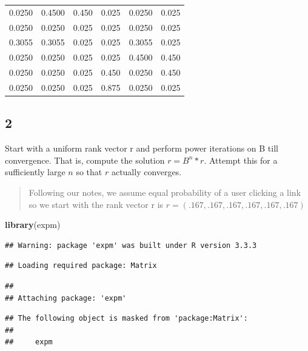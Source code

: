 \documentclass[]{article}
\newenvironment{Shaded}{\begin{snugshade}}{\end{snugshade}}
\newcommand{\KeywordTok}[1]{\textcolor[rgb]{0.13,0.29,0.53}{\textbf{{#1}}}}
\newcommand{\DecValTok}[1]{\textcolor[rgb]{0.00,0.00,0.81}{{#1}}}
\newcommand{\StringTok}[1]{\textcolor[rgb]{0.31,0.60,0.02}{{#1}}}
\newcommand{\NormalTok}[1]{{#1}}
\begin{document}
\begin{longtable}[]{@{}rrrrrr@{}}
\toprule
0.0250 & 0.4500 & 0.450 & 0.025 & 0.0250 & 0.025\tabularnewline
0.0250 & 0.0250 & 0.025 & 0.025 & 0.0250 & 0.025\tabularnewline
0.3055 & 0.3055 & 0.025 & 0.025 & 0.3055 & 0.025\tabularnewline
0.0250 & 0.0250 & 0.025 & 0.025 & 0.4500 & 0.450\tabularnewline
0.0250 & 0.0250 & 0.025 & 0.450 & 0.0250 & 0.450\tabularnewline
0.0250 & 0.0250 & 0.025 & 0.875 & 0.0250 & 0.025\tabularnewline
\bottomrule
\end{longtable}

\subsection{2}\label{section-1}

Start with a uniform rank vector r and perform power iterations on B
till convergence. That is, compute the solution \(r = B^n * r\). Attempt
this for a sufficiently large \(n\) so that \(r\) actually converges.

\begin{quote}
Following our notes, we assume equal probability of a user clicking a
link so we start with the rank vector r is
\(r = (.167, .167, .167, .167, .167, .167)\)
\end{quote}

\begin{Shaded}
\begin{Highlighting}[]
\KeywordTok{library}\NormalTok{(expm) }
\end{Highlighting}
\end{Shaded}

\begin{verbatim}
## Warning: package 'expm' was built under R version 3.3.3
\end{verbatim}

\begin{verbatim}
## Loading required package: Matrix
\end{verbatim}

\begin{verbatim}
## 
## Attaching package: 'expm'
\end{verbatim}

\begin{verbatim}
## The following object is masked from 'package:Matrix':
## 
##     expm
\end{verbatim}

\begin{Shaded}
\end{Shaded}
\end{document}
